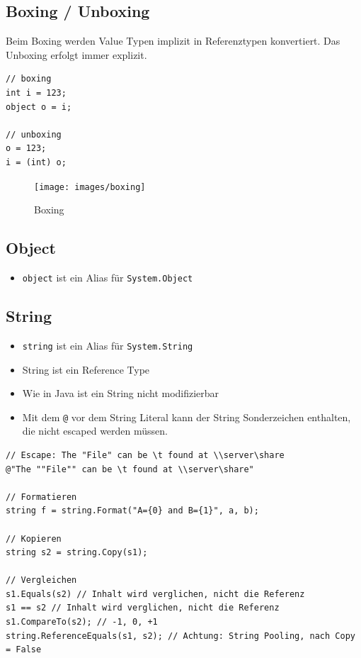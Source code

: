 \clearpage

\subsection{Boxing / Unboxing}
Beim Boxing werden Value Typen implizit in Referenztypen konvertiert. Das Unboxing erfolgt immer explizit. 
\begin{lstlisting}
// boxing
int i = 123;
object o = i;

// unboxing
o = 123;
i = (int) o;
\end{lstlisting}

\begin{figure}[h!]
\centering
\texttt{[image: images/boxing]}
\caption{Boxing}
\label{fig:boxing}
\end{figure}



\subsection{Object}
\begin{itemize}
	\item \lstinline|object| ist ein Alias für \lstinline|System.Object|
\end{itemize}

\subsection{String}
\begin{itemize}
	\item \lstinline|string| ist ein Alias für \lstinline|System.String|
	\item String ist ein Reference Type
	\item Wie in Java ist ein String nicht modifizierbar
	\item Mit dem \lstinline|@| vor dem String Literal kann der String Sonderzeichen enthalten, die nicht escaped werden müssen.
\end{itemize}
\begin{lstlisting}
// Escape: The "File" can be \t found at \\server\share
@"The ""File"" can be \t found at \\server\share"

// Formatieren
string f = string.Format("A={0} and B={1}", a, b);

// Kopieren
string s2 = string.Copy(s1);

// Vergleichen
s1.Equals(s2) // Inhalt wird verglichen, nicht die Referenz
s1 == s2 // Inhalt wird verglichen, nicht die Referenz
s1.CompareTo(s2); // -1, 0, +1 
string.ReferenceEquals(s1, s2); // Achtung: String Pooling, nach Copy = False
\end{lstlisting}

